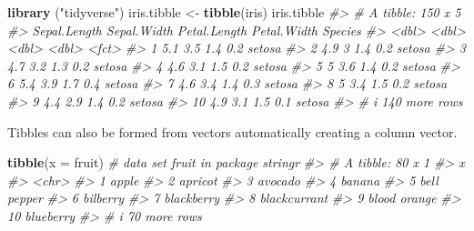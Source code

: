 \documentclass[
]{book}
\newenvironment{Shaded}{\begin{snugshade}}{\end{snugshade}}
\newcommand{\AttributeTok}[1]{\textcolor[rgb]{0.13,0.29,0.53}{#1}}
\newcommand{\CommentTok}[1]{\textcolor[rgb]{0.56,0.35,0.01}{\textit{#1}}}
\newcommand{\FunctionTok}[1]{\textcolor[rgb]{0.13,0.29,0.53}{\textbf{#1}}}
\newcommand{\NormalTok}[1]{#1}
\newcommand{\OtherTok}[1]{\textcolor[rgb]{0.56,0.35,0.01}{#1}}
\newcommand{\StringTok}[1]{\textcolor[rgb]{0.31,0.60,0.02}{#1}}
\begin{document}
\begin{Shaded}
\begin{Highlighting}[]
\FunctionTok{library}\NormalTok{ (}\StringTok{"tidyverse"}\NormalTok{)}
\NormalTok{iris.tibble }\OtherTok{\textless{}{-}} \FunctionTok{tibble}\NormalTok{(iris)}
\NormalTok{iris.tibble}
\CommentTok{\#\textgreater{} \# A tibble: 150 x 5}
\CommentTok{\#\textgreater{}    Sepal.Length Sepal.Width Petal.Length Petal.Width Species}
\CommentTok{\#\textgreater{}           \textless{}dbl\textgreater{}       \textless{}dbl\textgreater{}        \textless{}dbl\textgreater{}       \textless{}dbl\textgreater{} \textless{}fct\textgreater{}  }
\CommentTok{\#\textgreater{}  1          5.1         3.5          1.4         0.2 setosa }
\CommentTok{\#\textgreater{}  2          4.9         3            1.4         0.2 setosa }
\CommentTok{\#\textgreater{}  3          4.7         3.2          1.3         0.2 setosa }
\CommentTok{\#\textgreater{}  4          4.6         3.1          1.5         0.2 setosa }
\CommentTok{\#\textgreater{}  5          5           3.6          1.4         0.2 setosa }
\CommentTok{\#\textgreater{}  6          5.4         3.9          1.7         0.4 setosa }
\CommentTok{\#\textgreater{}  7          4.6         3.4          1.4         0.3 setosa }
\CommentTok{\#\textgreater{}  8          5           3.4          1.5         0.2 setosa }
\CommentTok{\#\textgreater{}  9          4.4         2.9          1.4         0.2 setosa }
\CommentTok{\#\textgreater{} 10          4.9         3.1          1.5         0.1 setosa }
\CommentTok{\#\textgreater{} \# i 140 more rows}
\end{Highlighting}
\end{Shaded}

Tibbles can also be formed from vectors automatically creating a column vector.

\begin{Shaded}
\begin{Highlighting}[]
\FunctionTok{tibble}\NormalTok{(}\AttributeTok{x =}\NormalTok{ fruit)   }\CommentTok{\# data set fruit in package stringr}
\CommentTok{\#\textgreater{} \# A tibble: 80 x 1}
\CommentTok{\#\textgreater{}    x           }
\CommentTok{\#\textgreater{}    \textless{}chr\textgreater{}       }
\CommentTok{\#\textgreater{}  1 apple       }
\CommentTok{\#\textgreater{}  2 apricot     }
\CommentTok{\#\textgreater{}  3 avocado     }
\CommentTok{\#\textgreater{}  4 banana      }
\CommentTok{\#\textgreater{}  5 bell pepper }
\CommentTok{\#\textgreater{}  6 bilberry    }
\CommentTok{\#\textgreater{}  7 blackberry  }
\CommentTok{\#\textgreater{}  8 blackcurrant}
\CommentTok{\#\textgreater{}  9 blood orange}
\CommentTok{\#\textgreater{} 10 blueberry   }
\CommentTok{\#\textgreater{} \# i 70 more rows}
\end{Highlighting}
\end{Shaded}
\end{document}
